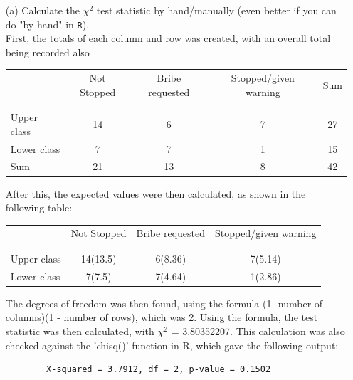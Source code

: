 \documentclass[12pt,letterpaper]{article}
\begin{document}
\begin{enumerate}
	
	\item [(a)]
	Calculate the $\chi^2$ test statistic by hand/manually (even better if you can do "by hand" in \texttt{R}).\\
	\vspace{7cm}
	\noindent First, the totals of each column and row was created, with an overall total being recorded also
	
	\begin{table}[h!]
		\centering
		\begin{tabular}{l | c c c c}
			& Not Stopped & Bribe requested & Stopped/given warning & Sum \\
			\\[-1.8ex] 
			\hline \\[-1.8ex]
			Upper class & 14 & 6 & 7 & 27 \\
			Lower class & 7 & 7 & 1 & 15 \\
			Sum & 21 & 13 & 8 & 42 \\
			\hline
		\end{tabular}
	\end{table}

	\noindent After this, the expected values were then calculated, as shown in the following table: \\
	\begin{table}[h!]
		\centering
		\begin{tabular}{l | c c c }
			& Not Stopped & Bribe requested & Stopped/given warning \\
			\\[-1.8ex] 
			\hline \\[-1.8ex]
			Upper class & 14(13.5) & 6(8.36) & 7(5.14) \\
			Lower class & 7(7.5) & 7(4.64) & 1(2.86) \\
			\hline
		\end{tabular}
	\end{table}

	\noindent The degrees of freedom was then found, using the formula (1- number of columns)(1 - number of rows), which was 2. Using the formula, the test statistic was then calculated, with $\chi^2$ = 3.80352207. This calculation was also checked against the 'chisq()' function in R, which gave the following output: \\
	\begin{verbatim}
		X-squared = 3.7912, df = 2, p-value = 0.1502
	\end{verbatim}
	

\end{enumerate}
\end{document}
